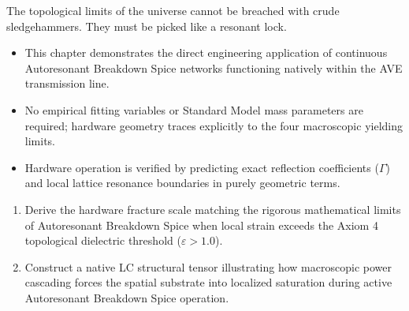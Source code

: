 The topological limits of the universe cannot be breached with crude sledgehammers. They must be picked like a resonant lock.

\begin{summarybox}
\begin{itemize}
    \item This chapter demonstrates the direct engineering application of continuous Autoresonant Breakdown Spice networks functioning natively within the AVE transmission line.
    \item No empirical fitting variables or Standard Model mass parameters are required; hardware geometry traces explicitly to the four macroscopic yielding limits.
    \item Hardware operation is verified by predicting exact reflection coefficients ($\Gamma$) and local lattice resonance boundaries in purely geometric terms.
\end{itemize}
\end{summarybox}

\begin{exercisebox}
\begin{enumerate}
    \item Derive the hardware fracture scale matching the rigorous mathematical limits of Autoresonant Breakdown Spice when local strain exceeds the Axiom 4 topological dielectric threshold ($\varepsilon > 1.0$).
    \item Construct a native LC structural tensor illustrating how macroscopic power cascading forces the spatial substrate into localized saturation during active Autoresonant Breakdown Spice operation.
\end{enumerate}
\end{exercisebox}
